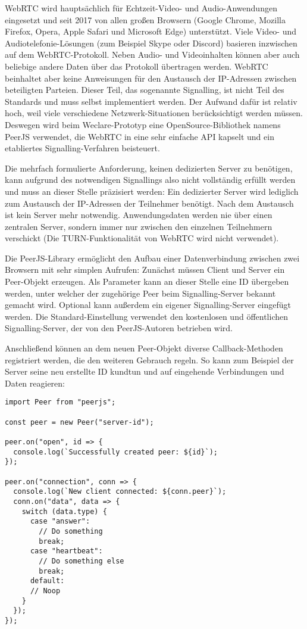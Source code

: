 WebRTC wird hauptsächlich für Echtzeit-Video- und Audio-Anwendungen eingesetzt und seit 2017 von allen großen Browsern (Google Chrome, Mozilla Firefox, Opera, Apple Safari und Microsoft Edge) unterstützt. Viele Video- und Audiotelefonie-Lösungen (zum Beispiel Skype oder Discord) basieren inzwischen auf dem WebRTC-Protokoll. Neben Audio- und Videoinhalten können aber auch beliebige andere Daten über das Protokoll übertragen werden. WebRTC beinhaltet aber keine Anweisungen für den Austausch der IP-Adressen zwischen beteiligten Parteien. Dieser Teil, das sogenannte Signalling, ist nicht Teil des Standards und muss selbst implementiert werden. Der Aufwand dafür ist relativ hoch, weil viele verschiedene Netzwerk-Situationen berücksichtigt werden müssen. Deswegen wird beim Weclare-Prototyp eine OpenSource-Bibliothek namens PeerJS\cite{web:peerjs} verwendet, die WebRTC in eine sehr einfache API kapselt und ein etabliertes Signalling-Verfahren beisteuert.

Die mehrfach formulierte Anforderung, keinen dedizierten Server zu benötigen, kann aufgrund des notwendigen Signallings also nicht vollständig erfüllt werden und muss an dieser Stelle präzisiert werden: Ein dedizierter Server wird lediglich zum Austausch der IP-Adressen der Teilnehmer benötigt. Nach dem Austausch ist kein Server mehr notwendig. Anwendungsdaten werden nie über einen zentralen Server, sondern immer nur zwischen den einzelnen Teilnehmern verschickt (Die TURN-Funktionalität von WebRTC wird nicht verwendet).

Die PeerJS-Library ermöglicht den Aufbau einer Datenverbindung zwischen zwei Browsern mit sehr simplen Aufrufen: Zunächst müssen Client und Server ein Peer-Objekt erzeugen. Als Parameter kann an dieser Stelle eine ID übergeben werden, unter welcher der zugehörige Peer beim Signalling-Server bekannt gemacht wird. Optional kann außerdem ein eigener Signalling-Server eingefügt werden. Die Standard-Einstellung verwendet den kostenlosen und öffentlichen Signalling-Server, der von den PeerJS-Autoren betrieben wird.

Anschließend können an dem neuen Peer-Objekt diverse Callback-Methoden registriert werden, die den weiteren Gebrauch regeln. So kann zum Beispiel der Server seine neu erstellte ID kundtun und auf eingehende Verbindungen und Daten reagieren:

\begin{minipage}{\linewidth}
\begin{lstlisting}[caption={Verbindungsaufbau mit der PeerJS-Bibliothek auf der Server-Seite. (aus: src/server/actions/server.js)}]
import Peer from "peerjs";

const peer = new Peer("server-id");

peer.on("open", id => {
  console.log(`Successfully created peer: ${id}`);
});

peer.on("connection", conn => {
  console.log(`New client connected: ${conn.peer}`);
  conn.on("data", data => {
    switch (data.type) {
      case "answer":
        // Do something
        break;
      case "heartbeat":
        // Do something else
        break;
      default:
      // Noop
    }
  });
});
\end{lstlisting}
\end{minipage}

